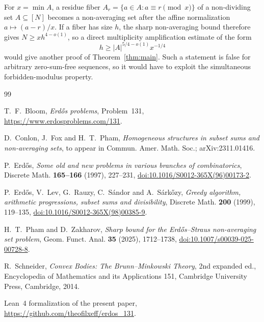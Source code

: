 \documentclass[11pt,reqno]{amsart}
\theoremstyle{definition}
\theoremstyle{remark}
\begin{document}
For $x=\min A$, a residue fiber $A_r=\{a\in A:a\equiv r\pmod x\}$ of a
non-dividing set $A\subseteq[N]$ becomes a non-averaging set after the
affine normalization $a\mapsto(a-r)/x$.  If a fiber has size $h$, the
sharp non-averaging bound therefore gives $N\ge xh^{4-o(1)}$, so a direct
multiplicity amplification estimate of the form
\[
 h\ge |A|^{5/4-o(1)}x^{-1/4}
\]
would give another proof of Theorem~\ref{thm:main}.  Such a statement is
false for arbitrary zero-sum-free sequences, so it would have to exploit
the simultaneous forbidden-modulus property.

\begin{thebibliography}{99}

T.~F.~Bloom,
\emph{Erd\H{o}s problems}, Problem~131,
\url{https://www.erdosproblems.com/131}.

D.~Conlon, J.~Fox and H.~T.~Pham,
\emph{Homogeneous structures in subset sums and non-averaging sets},
to appear in Commun. Amer. Math. Soc.; arXiv:2311.01416.

P.~Erd\H{o}s,
\emph{Some old and new problems in various branches of combinatorics},
Discrete Math. \textbf{165--166} (1997), 227--231,
\href{https://doi.org/10.1016/S0012-365X(96)00173-2}{doi:10.1016/S0012-365X(96)00173-2}.

P.~Erd\H{o}s, V.~Lev, G.~Rauzy, C.~S\'andor and A.~S\'ark\H{o}zy,
\emph{Greedy algorithm, arithmetic progressions, subset sums and divisibility},
Discrete Math. \textbf{200} (1999), 119--135,
\href{https://doi.org/10.1016/S0012-365X(98)00385-9}{doi:10.1016/S0012-365X(98)00385-9}.

H.~T.~Pham and D.~Zakharov,
\emph{Sharp bound for the Erd\H{o}s--Straus non-averaging set problem},
Geom. Funct. Anal. \textbf{35} (2025), 1712--1738,
\href{https://doi.org/10.1007/s00039-025-00728-8}{doi:10.1007/s00039-025-00728-8}.

R.~Schneider,
\emph{Convex Bodies: The Brunn--Minkowski Theory},
2nd expanded ed., Encyclopedia of Mathematics and its Applications 151,
Cambridge University Press, Cambridge, 2014.

Lean~4 formalization of the present paper,
\url{https://github.com/theofilxeff/erdos_131}.

\end{thebibliography}
\end{document}
